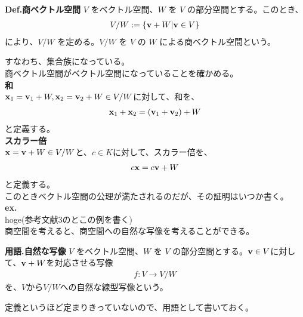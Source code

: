 \documentclass[a4paper,11pt]{jsarticle}
\numberwithin{equation}{section}
\begin{document}
\begin{itembox}[l]{\textbf{Def.商ベクトル空間}}
  $V$ をベクトル空間、$W$ を $V$ の部分空間とする。このとき、
  \begin{align}
      V/W := \{\vb{v} + W | \vb{v} \in V\}
  \end{align}
  により、$V/W$ を定める。$V/W$ を $V$ の $W$ による商ベクトル空間という。
\end{itembox}
すなわち、集合族になっている。\\
商ベクトル空間がベクトル空間になっていることを確かめる。\\
\textbf{和}\\
$\vb{x}_1 = \vb{v}_1 + W, \vb{x}_2 = \vb{v}_2 + W \in V/W$に対して、和を、
\begin{align}
  \vb{x}_1 + \vb{x}_2 = (\vb{v}_1 + \vb{v}_2) + W
\end{align}
と定義する。\\
\textbf{スカラー倍}\\
$\vb{x} = \vb{v} + W \in V/W$と、$c \in K$に対して、スカラー倍を、
\begin{align}
  c\vb{x} = c\vb{v} + W
\end{align}
と定義する。\\
このときベクトル空間の公理が満たされるのだが、その証明はいつか書く。\\

\textbf{ex.}\\
hoge(参考文献3のとこの例を書く)\\

商空間を考えると、商空間への自然な写像を考えることができる。\\
\begin{itembox}[l]{\textbf{用語.自然な写像}}
  $V$ をベクトル空間、$W$ を $V$ の部分空間とする。$\vb{v}\in V$に対して、$\vb{v} + W$を対応させる写像
  \begin{align}
    f: V \to V/W
  \end{align}
  を、$V$から$V/W$への自然な線型写像という。
\end{itembox}
定義というほど定まりきっていないので、用語として書いておく。\\
\end{document}
